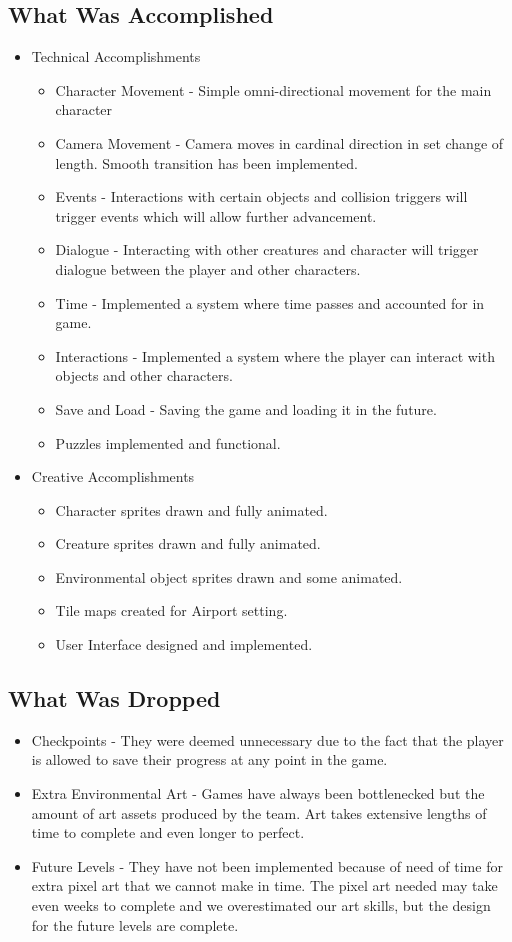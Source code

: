 \documentclass[a4paper]{article}
\begin{document}
\subsection{What Was Accomplished}
\begin{itemize}
\item Technical Accomplishments
\begin{itemize}
\item Character Movement - Simple omni-directional movement for the main character
\item Camera Movement - Camera moves in cardinal direction in set change of length. Smooth transition has been implemented.
\item Events - Interactions with certain objects and collision triggers will trigger events which will allow further advancement.
\item Dialogue - Interacting with other creatures and character will trigger dialogue between the player and other characters.
\item Time - Implemented a system where time passes and accounted for in game.
\item Interactions - Implemented a system where the player can interact with objects and other characters.
\item Save and Load - Saving the game and loading it in the future.
\item Puzzles implemented and functional.
\end{itemize}
\item Creative Accomplishments
\begin{itemize}
\item Character sprites drawn and fully animated.
\item Creature sprites drawn and fully animated.
\item Environmental object sprites drawn and some animated.
\item Tile maps created for Airport setting.
\item User Interface designed and implemented.
\end{itemize}
\end{itemize}

\subsection{What Was Dropped}
\begin{itemize}
\item Checkpoints - They were deemed unnecessary due to the fact that the player is allowed to save their progress at any point in the game. 
\item Extra Environmental Art - Games have always been bottlenecked but the amount of art assets produced by the team. Art takes extensive lengths of time to complete and even longer to perfect.
\item Future Levels - They have not been implemented because of need of time for extra pixel art that we cannot make in time. The pixel art needed may take even weeks to complete and we overestimated our art skills, but the design for the future levels are complete.
\end{itemize}
\end{document}

